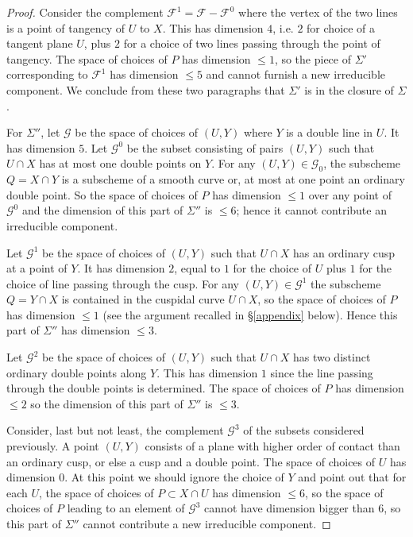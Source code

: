 \documentclass{amsart}
\theoremstyle{plain}
\numberwithin{equation}{section}
\begin{document}
\begin{proof}
Consider the complement ${{\mathcal F}} ^1= {{\mathcal F}} -{{\mathcal F}} ^0$ where the vertex of the two lines is
a point of tangency of $U$ to $X$. This has dimension $4$, i.e.
$2$ for choice of a tangent plane $U$,
plus $2$ for a choice of two lines passing through the point of tangency.
The space of choices of $P$ has dimension $\leq 1$, so the piece of $\Sigma '$
corresponding to ${{\mathcal F}} ^1$ has dimension $\leq 5$ and cannot furnish a new irreducible
component. We conclude from these two paragraphs that $\Sigma '$ is in the
closure of $\Sigma$.

For $\Sigma ''$, let ${{\mathcal G}}$ be the space of choices of $(U,Y)$ where $Y$ is a double
line in $U$. It has dimension $5$. Let ${{\mathcal G}} ^0$ be the subset consisting of 
pairs $(U,Y)$ such that $U\cap X$ has at most one double points on $Y$.
For any $(U,Y)\in {{\mathcal G}} _0$, the subscheme $Q=X\cap Y$ is a subscheme of a smooth
curve or, at most at one point an ordinary double point. So the space of choices of
$P$ has dimension $\leq 1$ over any point of ${{\mathcal G}} ^0$ and the dimension of this part of 
$\Sigma ''$ is $\leq 6$; hence it cannot contribute an irreducible component. 

Let ${{\mathcal G}} ^1$ be the space of choices of $(U,Y)$ such that $U\cap X$ has an ordinary cusp
at a point of $Y$. It has dimension $2$, equal to $1$ for the choice of $U$ plus $1$
for the choice of line passing through the cusp. For any $(U,Y)\in {{\mathcal G}} ^1$ the
subscheme $Q=Y\cap X$ is contained in the cuspidal curve $U\cap X$,
so the space of choices of $P$ has dimension $\leq 1$ (see the argument recalled in 
\S \ref{appendix} below). Hence this part of $\Sigma ''$ has dimension $\leq 3$. 

Let ${{\mathcal G}} ^2$ be the space of choices of $(U,Y)$ such that $U\cap X$ has two distinct
ordinary double points along $Y$. This has dimension $1$ since the line passing through
the double points is determined. The space of choices of $P$ has dimension $\leq 2$
so the dimension of this part of $\Sigma ''$ is $\leq 3$. 

Consider, last but not least, the complement ${{\mathcal G}} ^3$ of the subsets considered previously.
A point $(U,Y)$ consists of a plane with higher order of contact than an ordinary cusp,
or else a cusp and a double point. The space of choices of $U$ has dimension $0$.
At this point we should ignore the choice of $Y$ and point out that for
each $U$, the space of choices of $P\subset X\cap U$ has dimension $\leq 6$,
so the space of choices of $P$ leading to an element of ${{\mathcal G}} ^3$ cannot have dimension
bigger than $6$, so this part of $\Sigma ''$ cannot contribute a new irreducible
component. 


\end{proof}
\end{document}
